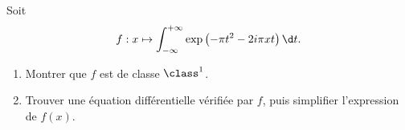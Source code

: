 \begin{enonce}
\begin{exercise}[ID={RMS135 E1484},subtitle={IMT MP 2024},tags={},difficulty={}]

Soit
\begin{equation*}
f : x \mapsto \int_{-\infty}^{+\infty} \exp\left(-\pi t^2 - 2i\pi x t\right) \d t.
\end{equation*}

\begin{enumerate}
  \item Montrer que $f$ est de classe $\class^1$.
  \item Trouver une équation différentielle vérifiée par $f$, puis simplifier l’expression de $f(x)$.
\end{enumerate}

\end{exercise}
\begin{solution}
\end{solution}
\end{enonce}
